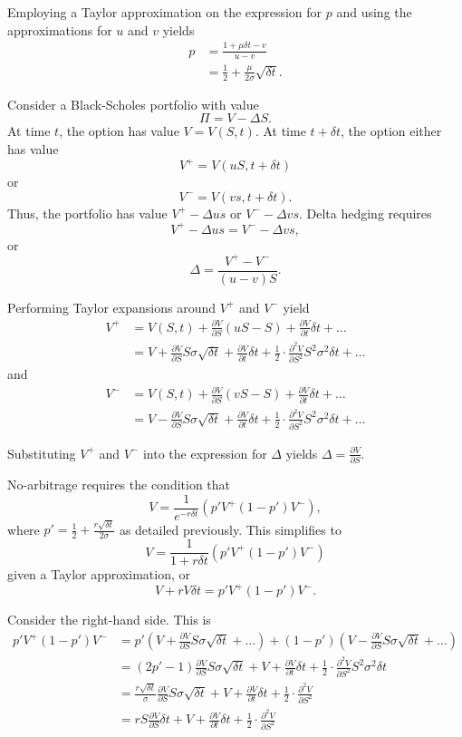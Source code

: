\documentclass[a4paper, 12pt,oneside,openany]{book}
\begin{document}
Employing a Taylor approximation on the expression for $p$ and using the approximations for $u$ and $v$ yields \begin{align*} p&=\frac{1+\mu \delta t-v}{u-v} \\ &= \frac{1}{2} + \frac{\mu}{2\sigma} \sqrt{\delta t}.\end{align*}

Consider a Black-Scholes portfolio with value $$\Pi = V-\Delta S.$$ At time $t$, the option has value $V=V(S, t)$. At time $t+\delta t$, the option either has value $$V^+=V(uS, t+\delta t)$$ or $$V^- = V(vs, t+\delta t).$$ Thus, the portfolio has value $V^+-\Delta us$ or $V^- -\Delta vs$. Delta hedging requires $$V^+-\Delta us = V^- -\Delta vs,$$ or $$\Delta = \frac{V^+-V^-}{(u-v)S}.$$

Performing Taylor expansions around $V^+$ and $V^-$ yield \begin{align*}V^+ &= V(S, t) + \frac{\partial V}{\partial S}(uS-S)+\frac{\partial V}{\partial t} \delta t+\dots \\ &= V+\frac{\partial V}{\partial S} S\sigma \sqrt{\delta t} + \frac{\partial V}{\partial t} \delta t + \frac{1}{2} \cdot \frac{\partial^2 V}{\partial S^2} S^2\sigma^2 \delta t+\dots  \end{align*} and  \begin{align*} V^- &= V(S, t) + \frac{\partial V}{\partial S}(vS-S)+\frac{\partial V}{\partial t} \delta t+\dots  \\ &= V-\frac{\partial V}{\partial S} S\sigma \sqrt{\delta t} + \frac{\partial V}{\partial t} \delta t + \frac{1}{2} \cdot \frac{\partial^2 V}{\partial S^2} S^2\sigma^2 \delta t+\dots \end{align*}

Substituting $V^+$ and $V^-$ into the expression for $\Delta$ yields $\Delta=\frac{\partial V}{\partial S}$.

No-arbitrage requires the condition that $$V = \frac{1}{e^{-r\delta t}} (p' V^+ (1-p')V^-),$$ where $p' = \frac{1}{2} + \frac{r \sqrt{\delta t}}{2\sigma}$ as detailed previously. This simplifies to $$V = \frac{1}{1+r \delta t} (p' V^+ (1-p')V^-)$$ given a Taylor approximation, or $$V + rV\delta t = p' V^+ (1-p')V^-.$$

Consider the right-hand side. This is \begin{align*}p' V^+ (1-p')V^- &= p' (V+\frac{\partial V}{\partial S} S\sigma \sqrt{\delta t} + \dots) + (1-p') (V-\frac{\partial V}{\partial S} S\sigma \sqrt{\delta t} + \dots) \\ &= (2p'-1) \frac{\partial V}{\partial S} S\sigma \sqrt{\delta t} + V+ \frac{\partial V}{\partial t} \delta t + \frac{1}{2} \cdot \frac{\partial^2 V}{\partial S^2} S^2 \sigma^2 \delta t \\ &= \frac{r \sqrt{\delta t}}{\sigma} \frac{\partial V}{\partial S} S\sigma \sqrt{\delta t} + V+ \frac{\partial V}{\partial t} \delta t + \frac{1}{2} \cdot \frac{\partial^2 V}{\partial S^2} \\ &= rS \frac{\partial V}{\partial S} \delta t + V+ \frac{\partial V}{\partial t} \delta t + \frac{1}{2} \cdot \frac{\partial^2 V}{\partial S^2}  \end{align*}
\end{document}
